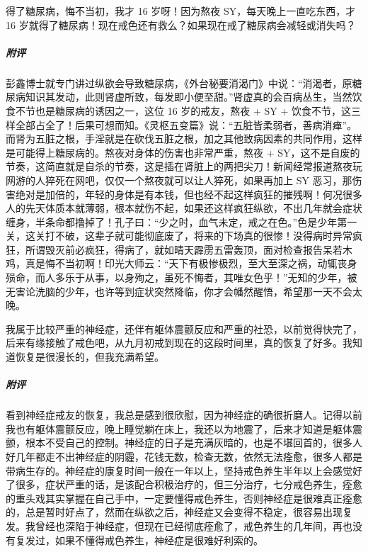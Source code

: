 \begin{case}
    得了糖尿病，悔不当初，我才 16 岁呀！因为熬夜 SY，每天晚上一直吃东西，才 16 岁就得了糖尿病！现在戒色还有救么？如果现在戒了糖尿病会减轻或消失吗？
    \subparagraph{附评} 彭鑫博士就专门讲过纵欲会导致糖尿病，《外台秘要消渴门》中说：“消渴者，原糖尿病知识其发动，此则肾虚所致，每发即小便至甜。”肾虚真的会百病丛生，当然饮食不节也是糖尿病的诱因之一，这位 16 岁的戒友，熬夜 + SY + 饮食不节，这三样全部占全了！后果可想而知。《灵枢五变篇》说：“五脏皆柔弱者，善病消瘅”。而肾为五脏之根，手淫就是在砍伐五脏之根，加之其他致病因素的共同作用，这样是可能得上糖尿病的。熬夜对身体的伤害也非常严重，熬夜 + SY，这不是自废的节奏，这简直就是自杀的节奏，这是插在肾脏上的两把尖刀！新闻经常报道熬夜玩网游的人猝死在网吧，仅仅一个熬夜就可以让人猝死，如果再加上 SY 恶习，那伤害绝对是加倍的，年轻的身体是有本钱，但也经不起这样疯狂的摧残啊！何况很多人的先天体质本就薄弱，根本就伤不起，如果还这样疯狂纵欲，不出几年就会症状缠身，半条命都撸掉了！孔子曰：“少之时，血气未定，戒之在色。”色是少年第一关，这关打不破，这辈子就可能彻底废了，将来的下场真的很惨！没得病时异常疯狂，所谓毁灭前必疯狂，得病了，就如晴天霹雳五雷轰顶，面对检查报告呆若木鸡，真是悔不当初啊！印光大师云：“天下有极惨极烈，至大至深之祸，动辄丧身殒命，而人多乐于从事，以身殉之，虽死不悔者，其唯女色乎！”无知的少年，被无害论洗脑的少年，也许等到症状突然降临，你才会幡然醒悟，希望那一天不会太晚。
\end{case}

\begin{case}
    我属于比较严重的神经症，还伴有躯体震颤反应和严重的社恐，以前觉得快完了，后来有缘接触了戒色吧，从九月初戒到现在的这段时间里，真的恢复了好多。我知道恢复是很漫长的，但我充满希望。
    \subparagraph{附评} 看到神经症戒友的恢复，我总是感到很欣慰，因为神经症的确很折磨人。记得以前我也有躯体震颤反应，晚上睡觉躺在床上，我还以为地震了，后来才知道是躯体震颤，根本不受自己的控制。神经症的日子是充满灰暗的，也是不堪回首的，很多人好几年都走不出神经症的阴霾，花钱无数，检查无数，依然无法痊愈，很多人都是带病生存的。神经症的康复时间一般在一年以上，坚持戒色养生半年以上会感觉好了很多，症状严重的话，是该配合积极治疗的，但三分治疗，七分戒色养生，痊愈的重头戏其实掌握在自己手中，一定要懂得戒色养生，否则神经症是很难真正痊愈的，总是暂时好点了，然而在纵欲之后，神经症又会变得不稳定，很容易出现复发。我曾经也深陷于神经症，但现在已经彻底痊愈了，戒色养生的几年间，再也没有复发过，如果不懂得戒色养生，神经症是很难好利索的。
\end{case}

